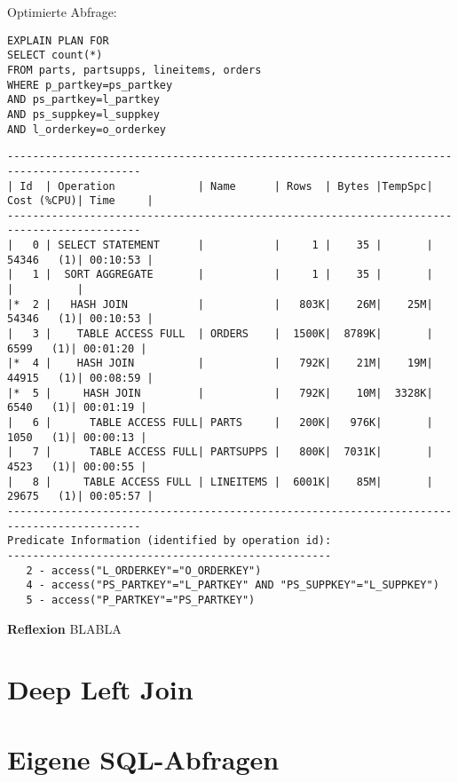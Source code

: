 \documentclass[10pt]{article}
\begin{document}
Optimierte Abfrage:
\begin{lstlisting}[style=sql]
EXPLAIN PLAN FOR
SELECT count(*)
FROM parts, partsupps, lineitems, orders
WHERE p_partkey=ps_partkey
AND ps_partkey=l_partkey
AND ps_suppkey=l_suppkey
AND l_orderkey=o_orderkey
\end{lstlisting}
\begin{lstlisting}[style=queryexecutionplan]
-------------------------------------------------------------------------------------------
| Id  | Operation             | Name      | Rows  | Bytes |TempSpc| Cost (%CPU)| Time     |
-------------------------------------------------------------------------------------------
|   0 | SELECT STATEMENT      |           |     1 |    35 |       | 54346   (1)| 00:10:53 |
|   1 |  SORT AGGREGATE       |           |     1 |    35 |       |            |          |
|*  2 |   HASH JOIN           |           |   803K|    26M|    25M| 54346   (1)| 00:10:53 |
|   3 |    TABLE ACCESS FULL  | ORDERS    |  1500K|  8789K|       |  6599   (1)| 00:01:20 |
|*  4 |    HASH JOIN          |           |   792K|    21M|    19M| 44915   (1)| 00:08:59 |
|*  5 |     HASH JOIN         |           |   792K|    10M|  3328K|  6540   (1)| 00:01:19 |
|   6 |      TABLE ACCESS FULL| PARTS     |   200K|   976K|       |  1050   (1)| 00:00:13 |
|   7 |      TABLE ACCESS FULL| PARTSUPPS |   800K|  7031K|       |  4523   (1)| 00:00:55 |
|   8 |     TABLE ACCESS FULL | LINEITEMS |  6001K|    85M|       | 29675   (1)| 00:05:57 |
-------------------------------------------------------------------------------------------
Predicate Information (identified by operation id):
---------------------------------------------------
   2 - access("L_ORDERKEY"="O_ORDERKEY")
   4 - access("PS_PARTKEY"="L_PARTKEY" AND "PS_SUPPKEY"="L_SUPPKEY")
   5 - access("P_PARTKEY"="PS_PARTKEY")
\end{lstlisting}
\textbf{Reflexion} \newline
BLABLA

\section{Deep Left Join}

\section{Eigene SQL-Abfragen}

\end{document}
